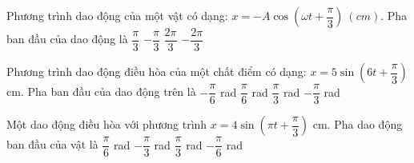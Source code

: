 
\begin{ex}
Phương trình dao động của một vật có dạng: $x=-A\cos(\omega t+\dfrac{\pi}{3})\ (cm)$. Pha ban đầu của dao động là
\choice
{$\dfrac{\pi}{3}$}
{$-\dfrac{\pi}{3}$}
{$\dfrac{2\pi}{3}$}
{\True $-\dfrac{2\pi}{3}$}
\end{ex} 
\begin{ex} %
Phương trình dao động điều hòa của một chất điểm có dạng: $x = 5\sin\left(6t + \dfrac{\pi}{3}\right)$ cm. Pha ban đầu của dao động trên là
\choice
{\True $-\dfrac{\pi}{6}$ rad}
{$\dfrac{\pi}{6}$ rad}
{$\dfrac{\pi}{3}$ rad}
{$-\dfrac{\pi}{3}$ rad}
\end{ex} 
\begin{ex} %
Một dao động điều hòa với phương trình $x = 4\sin\left(\pi t + \dfrac{\pi}{3}\right)$ cm. Pha dao động ban đầu  của vật là
\choice
{$\dfrac{\pi}{6}$ rad}
{$-\dfrac{\pi}{3}$ rad}
{$\dfrac{\pi}{3}$ rad}
{\True $-\dfrac{\pi}{6}$ rad}
\end{ex} 

